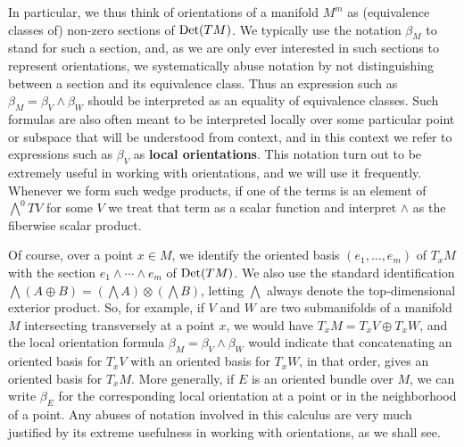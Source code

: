 In particular, we thus think of orientations of a manifold $M^m$ as (equivalence classes of) non-zero sections of ${\rm Det}(TM)$.
We typically use the notation $\beta_M$ to stand for such a section, and, as we are only ever interested in such sections to represent orientations, we systematically abuse notation by not distinguishing between a section and its equivalence class.
Thus an expression such as $\beta_M = \beta_V \wedge \beta_W$ should be interpreted as an equality of equivalence classes.
Such formulas are also often meant to be interpreted locally over some particular point or subspace that will be understood from context, and in this context we refer to expressions such as $\beta_V$ as \textbf{local orientations}.
This notation turn out to be extremely useful in working with orientations, and we will use it frequently.
Whenever we form such wedge products, if one of the terms is an element of $\bigwedge^0 TV$ for some $V$ we treat that term as a scalar function and interpret $\wedge$ as the fiberwise scalar product.

Of course, over a point $x \in M$, we identify the oriented basis $(e_1,\ldots, e_m)$ of $T_xM$ with the section $e_1 \wedge \cdots \wedge e_m$ of ${\rm Det}(TM)$.
We also use the standard identification $\bigwedge (A\oplus B)=(\bigwedge A )\otimes (\bigwedge B)$, letting $\bigwedge$ always denote the top-dimensional exterior product.
So, for example, if $V$ and $W$ are two submanifolds of a manifold $M$ intersecting transversely at a point $x$, we would have $T_xM = T_xV\oplus T_xW$, and the local orientation formula $\beta_M = \beta_V \wedge \beta_W$ would indicate that concatenating an oriented basis for $T_xV$ with an oriented basis for $T_xW$, in that order, gives an oriented basis for $T_xM$.
More generally, if $E$ is an oriented bundle over $M$, we can write $\beta_E$ for the corresponding local orientation at a point or in the neighborhood of a point.
Any abuses of notation involved in this calculus are very much justified by its extreme usefulness in working with orientations, as we shall see.

